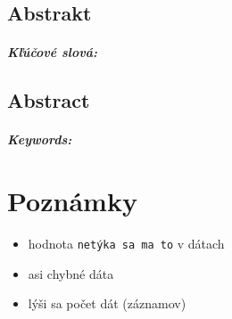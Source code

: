 \documentclass[12pt, twoside]{book}
\begin{document}
\section*{Abstrakt}


\paragraph*{Kľúčové slová:}



\newpage 
\section*{Abstract}


\paragraph*{Keywords:} 




%
%
%



\newpage 

\tableofcontents



\newpage 



\mainmatter
\pagestyle{headings}


\chapter*{Poznámky}
\begin{itemize}
	\item hodnota \verb|netýka sa ma to| v dátach
	\item asi chybné dáta
	\item lýši sa počet dát (záznamov)
\end{itemize}
\end{document}
